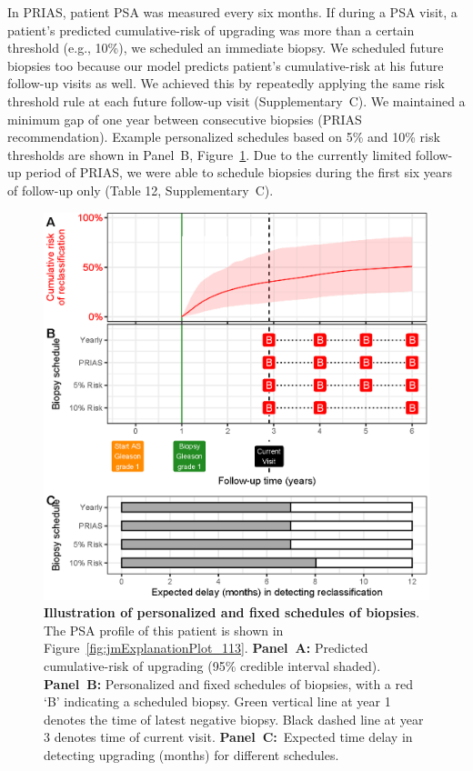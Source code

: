 In PRIAS, patient PSA was measured every six months. If during a PSA visit, a patient's predicted cumulative-risk of upgrading was more than a certain threshold (e.g., 10\%), we scheduled an immediate biopsy. We scheduled future biopsies too because our model predicts patient's cumulative-risk at his future follow-up visits as well. We achieved this by repeatedly applying the same risk threshold rule at each future follow-up visit (Supplementary~C). We maintained a minimum gap of one year between consecutive biopsies (PRIAS recommendation). Example personalized schedules based on 5\% and 10\% risk thresholds are shown in Panel~B, Figure~\ref{fig:demo_pat1}. Due to the currently limited follow-up period of PRIAS, we were able to schedule biopsies during the first six years of follow-up only (Table 12, Supplementary~C).

\begin{figure}[!htb]
\centerline{\includegraphics[width=\columnwidth]{images/demo_pat1.eps}}
\caption{\textbf{Illustration of personalized and fixed schedules of biopsies}. The PSA profile of this patient is shown in Figure~\ref{fig:jmExplanationPlot_113}. \textbf{Panel~A:} Predicted cumulative-risk of upgrading (95\% credible interval shaded). \textbf{Panel~B:} Personalized and fixed schedules of biopsies, with a red `B' indicating a scheduled biopsy. Green vertical line at year 1 denotes the time of latest negative biopsy. Black dashed line at year 3 denotes time of current visit. \textbf{Panel~C:}\ Expected time delay in detecting upgrading (months) for different schedules.}
\label{fig:demo_pat1}
\end{figure}

